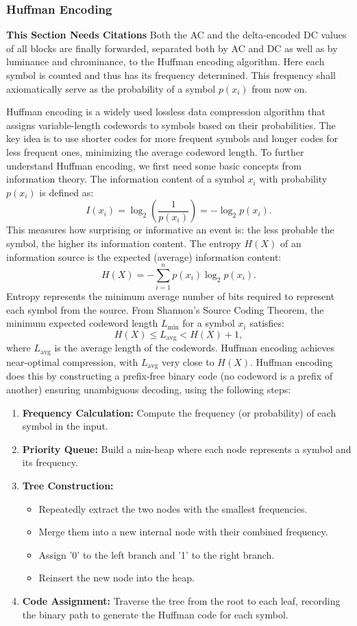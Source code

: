 \subsubsection{Huffman Encoding}

\textbf{This Section Needs Citations}
Both the AC and the delta-encoded DC values of all blocks are finally forwarded, separated both by AC and DC as well as by luminance and chrominance, to the Huffman encoding algorithm. Here each symbol is counted and thus has its frequency determined. This frequency shall axiomatically serve as the probability of a symbol \(p(x_i)\) from now on.

Huffman encoding is a widely used lossless data compression algorithm that assigns variable-length codewords to symbols based on their probabilities. The key idea is to use shorter codes for more frequent symbols and longer codes for less frequent ones, minimizing the average codeword length. To further understand Huffman encoding, we first need some basic concepts from information theory. 
The information content of a symbol \( x_i \) with probability \( p(x_i) \) is defined as:
\[
I(x_i) = \log_2 \left( \frac{1}{p(x_i)} \right) = -\log_2 p(x_i).
\]
This measures how surprising or informative an event is: the less probable the symbol, the higher its information content.
The entropy \( H(X) \) of an information source is the expected (average) information content:
\[
H(X) = -\sum_{i=1}^{n} p(x_i) \log_2 p(x_i).
\]
Entropy represents the minimum average number of bits required to represent each symbol from the source.
From Shannon's Source Coding Theorem, the minimum expected codeword length \( L_{\text{min}} \) for a symbol \( x_i \) satisfies:
\[
H(X) \leq L_{\text{avg}} < H(X) + 1,
\]
where \( L_{\text{avg}} \) is the average length of the codewords. Huffman encoding achieves near-optimal compression, with \( L_{\text{avg}} \) very close to \( H(X) \).
Huffman encoding does this by constructing a prefix-free binary code (no codeword is a prefix of another) ensuring unambiguous decoding, using the following steps:
\begin{enumerate}
	\item \textbf{Frequency Calculation:} Compute the frequency (or probability) of each symbol in the input.
	\item \textbf{Priority Queue:} Build a min-heap where each node represents a symbol and its frequency.
	\item \textbf{Tree Construction:}  
	\begin{itemize}
		\item Repeatedly extract the two nodes with the smallest frequencies.
		\item Merge them into a new internal node with their combined frequency.
		\item Assign '0' to the left branch and '1' to the right branch.
		\item Reinsert the new node into the heap.
	\end{itemize}
	\item \textbf{Code Assignment:} Traverse the tree from the root to each leaf, recording the binary path to generate the Huffman code for each symbol.
\end{enumerate}


